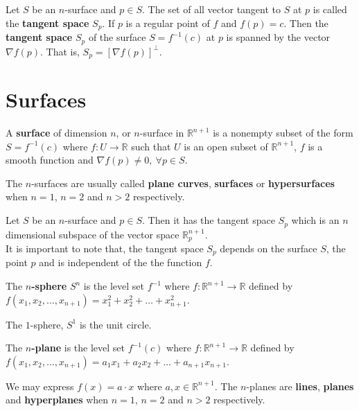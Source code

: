 \begin{definition}
	Let $S$ be an $n$-surface and $p \in S$.
	The set of all vector tangent to $S$ at $p$ is called the \textbf{tangent space} $S_p$.
	If $p$ is a regular point of $f$ and $f(p) = c$. Then the \textbf{tangent space} $S_p$ of the surface $S = f^{-1}(c)$ at $p$ is spanned by the vector $\nabla f(p)$.
	That is, $S_p = [\nabla f(p)]^\perp$.
\end{definition}

\section{Surfaces}
\begin{definition}
	A \textbf{surface} of dimension $n$, or $n$-surface in $\mathbb{R}^{n+1}$ is a nonempty subset of the form $S = f^{-1}(c)$ where $f : U \to \mathbb{R}$ such that $U$ is an open subset of $\mathbb{R}^{n+1}$, $f$ is a smooth function  and $\nabla f(p) \ne 0,\ \forall p \in S$.
\end{definition}
	The $n$-surfaces are usually called \textbf{plane curves}, \textbf{surfaces} or \textbf{hypersurfaces} when $n=1$, $n=2$ and $n>2$ respectively.

\begin{remark}
	Let $S$ be an $n$-surface and $p \in S$.
	Then it has the tangent space $S_p$ which is an $n$ dimensional subspace of the vector space $\mathbb{R}_p^{n+1}$.\\

	It is important to note that, the tangent space $S_p$ depends on the surface $S$, the point $p$ and is independent of the the function $f$.
\end{remark}

\begin{definition}
	The \textbf{$n$-sphere} $S^n$ is the level set $f^{-1}$ where $f : \mathbb{R}^{n+1} \to \mathbb{R}$ defined by $f(x_1,x_2,\dots,x_{n+1}) = x_1^2+x_2^2+\dots+x_{n+1}^2$.
\end{definition}
	The $1$-sphere, $S^1$ is the unit circle.

\begin{definition}
	The \textbf{$n$-plane} is the level set $f^{-1}(c)$ where $f : \mathbb{R}^{n+1} \to \mathbb{R}$ defined by $f(x_1,x_2,\dots,x_{n+1}) = a_1x_1+a_2x_2+\dots+a_{n+1}x_{n+1}$.
\end{definition}
	We may express $f(x) = a \cdot x$ where $a,x \in \mathbb{R}^{n+1}$.
	The $n$-planes are \textbf{lines}, \textbf{planes} and \textbf{hyperplanes} when $n=1$, $n=2$ and $n>2$ respectively.

